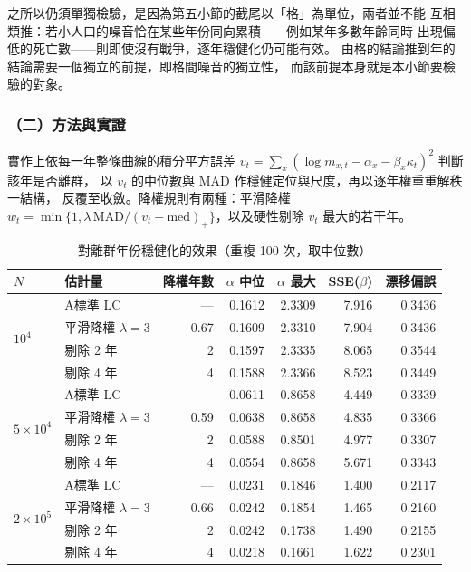 \documentclass[UTF8, fontset=macnew, a4paper, 12pt]{ctexart}
\begin{document}
之所以仍須單獨檢驗，是因為第五小節的截尾以「格」為單位，兩者並不能
互相類推：若小人口的噪音恰在某些年份同向累積——例如某年多數年齡同時
出現偏低的死亡數——則即使沒有戰爭，逐年穩健化仍可能有效。
由格的結論推到年的結論需要一個獨立的前提，即格間噪音的獨立性，
而該前提本身就是本小節要檢驗的對象。

\subsubsection{（二）方法與實證}

實作上依每一年整條曲線的積分平方誤差
$v_t=\sum_x(\log m_{x,t}-\alpha_x-\beta_x\kappa_t)^2$ 判斷該年是否離群，
以 $v_t$ 的中位數與 MAD 作穩健定位與尺度，再以逐年權重重解秩一結構，
反覆至收斂。降權規則有兩種：平滑降權
$w_t=\min\{1,\lambda\,\mathrm{MAD}/(v_t-\mathrm{med})_+\}$，以及硬性剔除
$v_t$ 最大的若干年。

\begin{table}[H]
\centering
\caption{對離群年份穩健化的效果（重複 100 次，取中位數）}
\small
\begin{tabular}{llrrrrr}
\toprule
$N$ & 估計量 & 降權年數 & $\alpha$ 中位 & $\alpha$ 最大 & SSE($\beta$) & 漂移偏誤\\
\midrule
\multirow{4}{*}{$10^4$}
 & A\quad 標準 LC        & ---  & 0.1612 & 2.3309 & 7.916 & 0.3436\\
 & 平滑降權 $\lambda=3$  & 0.67 & 0.1609 & 2.3310 & 7.904 & 0.3436\\
 & 剔除 2 年             & 2    & 0.1597 & 2.3335 & 8.065 & 0.3544\\
 & 剔除 4 年             & 4    & 0.1588 & 2.3366 & 8.523 & 0.3449\\
\midrule
\multirow{4}{*}{$5\times10^4$}
 & A\quad 標準 LC        & ---  & 0.0611 & 0.8658 & 4.449 & 0.3339\\
 & 平滑降權 $\lambda=3$  & 0.59 & 0.0638 & 0.8658 & 4.835 & 0.3366\\
 & 剔除 2 年             & 2    & 0.0588 & 0.8501 & 4.977 & 0.3307\\
 & 剔除 4 年             & 4    & 0.0554 & 0.8658 & 5.671 & 0.3343\\
\midrule
\multirow{4}{*}{$2\times10^5$}
 & A\quad 標準 LC        & ---  & 0.0231 & 0.1846 & 1.400 & 0.2117\\
 & 平滑降權 $\lambda=3$  & 0.66 & 0.0242 & 0.1854 & 1.465 & 0.2160\\
 & 剔除 2 年             & 2    & 0.0242 & 0.1738 & 1.490 & 0.2155\\
 & 剔除 4 年             & 4    & 0.0218 & 0.1661 & 1.622 & 0.2301\\
\bottomrule
\end{tabular}
\label{tab:hu}
\end{table}
\end{document}
